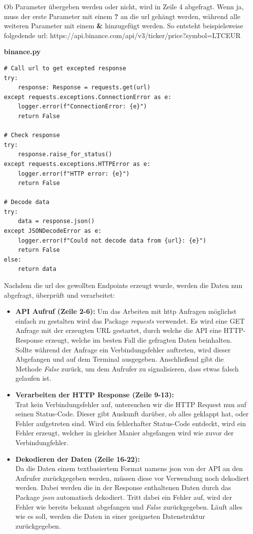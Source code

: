 \documentclass[oneside]{ausarbeitung}
\begin{document}
Ob Parameter übergeben werden oder nicht, wird in Zeile 4 abgefragt. Wenn ja, muss der erste Parameter mit einem \textbf{?} an die \ac{url} gehängt werden, während alle weiteren Parameter mit einem \textbf{\&} hinzugefügt werden. So entsteht beispielsweise folgedende \ac{url}: https://api.binance.com/api/v3/ticker/price?symbol=LTCEUR

\lstset{language=Python}
\lstset{frame=lines}
\lstset{basicstyle=\footnotesize}
\textbf{binance.py}
\begin{lstlisting}
# Call url to get excepted response
try:
	response: Response = requests.get(url)
except requests.exceptions.ConnectionError as e:
	logger.error(f"ConnectionError: {e}")
	return False

# Check response
try:
	response.raise_for_status()
except requests.exceptions.HTTPError as e:
	logger.error(f"HTTP error: {e}")
	return False

# Decode data
try:
	data = response.json()
except JSONDecodeError as e:
	logger.error(f"Could not decode data from {url}: {e}")
	return False
else:
	return data
\end{lstlisting}

Nachdem die \ac{url} des gewollten Endpoints erzeugt wurde, werden die Daten nun abgefragt, überprüft und verarbeitet:
\begin{itemize}
	\item \textbf{API Aufruf (Zeile 2-6):}
		Um das Arbeiten mit \ac{http} Anfragen möglichst einfach zu gestalten
		wird das Package \textit{requests} verwendet. Es wird eine GET Anfrage mit
		der erzeugten URL gestartet, durch welche die API eine HTTP-Response
		erzeugt, welche im besten Fall die gefragten Daten beinhalten.
		Sollte während der Anfrage ein Verbindungsfehler auftreten, wird dieser
		Abgefangen und auf dem Terminal ausgegeben. Anschließend gibt die Methode
		\textit{False} zurück, um dem Aufrufer zu signalisieren, dass etwas falsch
		gelaufen ist.
	\item \textbf{Verarbeiten der HTTP Response (Zeile 9-13):} \\
		Trat kein Verbindungsfehler auf, untersuchen wir die HTTP Request nun auf
		seinen Status-Code. Dieser gibt Auskunft darüber, ob alles geklappt hat,
		oder Fehler aufgetreten sind. Wird ein fehlerhafter Status-Code entdeckt,
		wird ein Fehler erzeugt, welcher in gleicher Manier abgefangen wird wie
		zuvor der Verbindungfehler.
	\item \textbf{Dekodieren der Daten (Zeile 16-22):} \\
		Da die Daten einem textbasiertem Format namens \ac{json} von der API an 
		den Aufrufer zurückgegeben werden, müssen diese vor Verwendung noch 
		dekodiert werden. Dabei werden die in der Response enthaltenen Daten
		durch das Package \textit{json} automatisch dekodiert. Tritt dabei ein
		Fehler auf, wird der Fehler wie bereits bekannt abgefangen und 
		\textit{False} zurückgegeben. Läuft alles wie es soll, werden die Daten
		in einer geeigneten Datenstruktur zurückgegeben.
\end{itemize}
\end{document}
